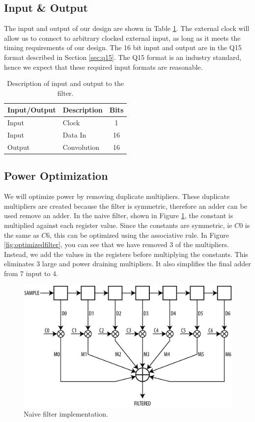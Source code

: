 \subsection{Input \& Output}
The input and output of our design are shown in Table \ref{table:inputoutput}.  The external clock will allow us to connect to arbitrary clocked external input, as long as it meets the timing requirements of our design.  The 16 bit input and output are in the Q15 format described in Section \ref{sec:q15}.  The Q15 format is an industry standard, hence we expect that these required input formats are reasonable.

\begin{table}[ht]
\centering
\begin{tabular}{l | l | c}
\hline
Input/Output & Description & Bits \\
\hline \hline
Input & Clock & 1 \\
Input & Data In & 16 \\
Output & Convolution & 16 \\
\end{tabular}
\caption{Description of input and output to the filter.}
\label{table:inputoutput}
\end{table}



\subsection{Power Optimization}

We will optimize power by removing duplicate multipliers.  These duplicate multipliers are created because the filter is symmetric, therefore an adder can be used remove an adder.  In the naive filter, shown in Figure \ref{fig:naivefilter}, the constant is multiplied against each register value.  Since the constants are symmetric, ie $C0$ is the same as $C6$, this can be optimized using the associative rule.  In Figure \ref{fig:optimizedfilter}, you can see that we have removed 3 of the multipliers.  Instead, we add the values in the registers before multiplying the constants.  This eliminates 3 large and power draining multipliers.  It also simplifies the final adder from 7 input to 4.


\begin{figure}[ht]
\centering
\includegraphics[width=5in]{images/filter_normal}
\caption{Naive filter implementation.}
\label{fig:naivefilter}
\end{figure}

